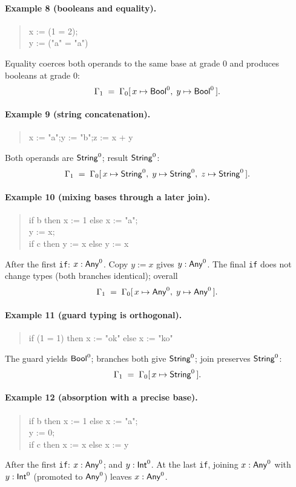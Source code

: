 \paragraph{Example 8 (booleans and equality).}
\begin{quote}\ttfamily
x := (1 = 2);\\
y := ("a" = "a")
\end{quote}
Equality coerces both operands to the same base at grade $0$ and produces booleans at grade $0$:
\[
\Gamma_1 \;=\; \Gamma_0[\,x \mapsto \mathsf{Bool}^{0},\; y \mapsto \mathsf{Bool}^{0}\,].
\]

\paragraph{Example 9 (string concatenation).}
\begin{quote}\ttfamily
x := "a";\quad y := "b";\quad z := x + y
\end{quote}
Both operands are $\mathsf{String}^{0}$; result $\mathsf{String}^{0}$:
\[
\Gamma_1 \;=\; \Gamma_0[\,x \mapsto \mathsf{String}^{0},\;
                       y \mapsto \mathsf{String}^{0},\;
                       z \mapsto \mathsf{String}^{0}\,].
\]

\paragraph{Example 10 (mixing bases through a later join).}
\begin{quote}\ttfamily
if b then x := 1 else x := "a";\\
y := x;\\
if c then y := x else y := x
\end{quote}
After the first \texttt{if}: $x:\mathsf{Any}^{0}$.  
Copy $y:=x$ gives $y:\mathsf{Any}^{0}$.  
The final \texttt{if} does not change types (both branches identical);
overall
\[
\Gamma_1 \;=\; \Gamma_0[\,x \mapsto \mathsf{Any}^{0},\; y \mapsto \mathsf{Any}^{0}\,].
\]

\paragraph{Example 11 (guard typing is orthogonal).}
\begin{quote}\ttfamily
if (1 = 1) then x := "ok" else x := "ko"
\end{quote}
The guard yields $\mathsf{Bool}^{0}$; branches both give $\mathsf{String}^{0}$; join preserves $\mathsf{String}^{0}$:
\[
\Gamma_1 \;=\; \Gamma_0[\,x \mapsto \mathsf{String}^{0}\,].
\]

\paragraph{Example 12 (absorption with a precise base).}
\begin{quote}\ttfamily
if b then x := 1 else x := "a";\\
y := 0;\\
if c then x := x else x := y
\end{quote}
After the first \texttt{if}: $x:\mathsf{Any}^{0}$; and $y:\mathsf{Int}^{0}$.  
At the last \texttt{if}, joining $x:\mathsf{Any}^{0}$ with $y:\mathsf{Int}^{0}$ (promoted to $\mathsf{Any}^{0}$) leaves $x:\mathsf{Any}^{0}$.

